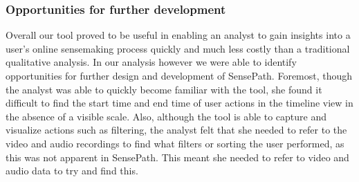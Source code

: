 \subsubsection{Opportunities for further development}
Overall our tool proved to be useful in enabling an analyst to gain insights into a user's online sensemaking process quickly and much less costly than a traditional qualitative analysis. In our analysis however we were able to identify opportunities for further design and development of SensePath. Foremost, though the analyst was able to quickly become familiar with the tool, she found it difficult to find the start time and end time of user actions in the timeline view in the absence of a visible scale. Also, although the tool is able to capture and visualize actions such as filtering, the analyst felt that she needed to refer to the video and audio recordings to find what filters or sorting the user performed, as this was not apparent in SensePath. This meant she needed to refer to video and audio data to try and find this.